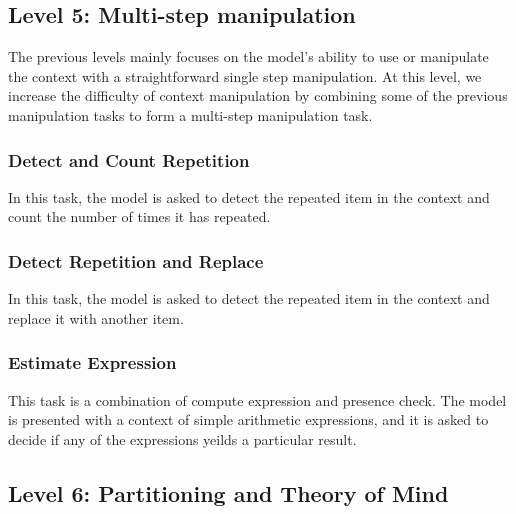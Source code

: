 \subsection{Level 5: Multi-step manipulation}
The previous levels mainly focuses on the model's ability to use or manipulate the context with a straightforward single step manipulation. At this level, we increase the difficulty of context manipulation by combining some of the previous manipulation tasks to form a multi-step manipulation task.

\subsubsection{Detect and Count Repetition}

In this task, the model is asked to detect the repeated item in the context and count the number of times it has repeated.

\subsubsection{Detect Repetition and Replace}

In this task, the model is asked to detect the repeated item in the context and replace it with another item.

\subsubsection{Estimate Expression}

This task is a combination of compute expression and presence check. The model is presented with a context of simple arithmetic expressions, and it is asked to decide if any of the expressions yeilds a particular result.

\subsection{Level 6: Partitioning and Theory of Mind}
